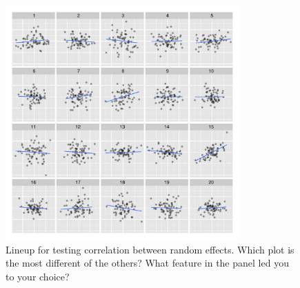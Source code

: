 \documentclass[12pt]{article} %
\newcommand{\alnote}[1]{\todo[inline,color=green!40]{#1}} %
\begin{document}
\begin{figure}[hbt]
	\centering
	\includegraphics[width=0.8\textwidth]{examcorr-15.pdf}
	\caption{\label{fig:ranef-corr} Lineup for testing correlation between random effects. Which plot is the most different of the others? What feature in the panel led you to your choice?}
\end{figure}

%


\end{document}
